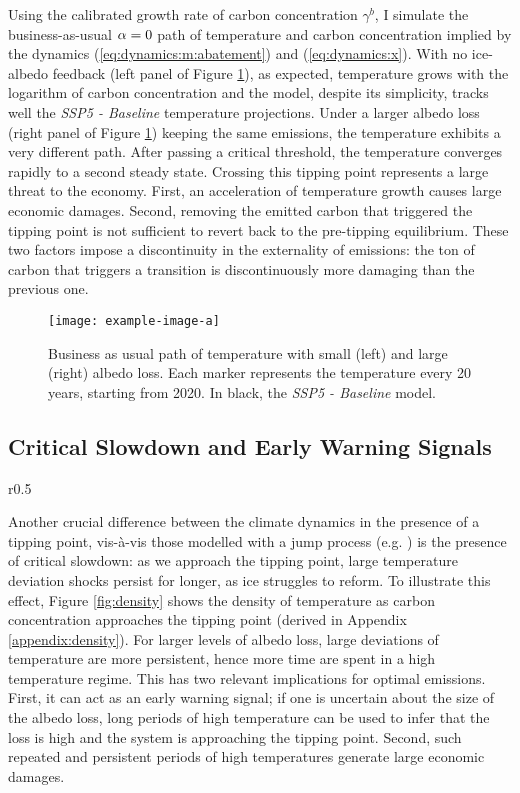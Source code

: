 \documentclass[../../main.tex]{subfiles}
\begin{document}
Using the calibrated growth rate of carbon concentration $\gamma^{b}$, I simulate the business-as-usual $\alpha = 0$ path of temperature and carbon concentration implied by the dynamics (\ref{eq:dynamics:m:abatement}) and (\ref{eq:dynamics:x}). With no ice-albedo feedback (left panel of Figure \ref{fig:bau}), as expected, temperature grows with the logarithm of carbon concentration and the model, despite its simplicity, tracks well the \textit{SSP5 - Baseline} temperature projections. Under a larger albedo loss (right panel of Figure \ref{fig:bau}) keeping the same emissions, the temperature exhibits a very different path. After passing a critical threshold, the temperature converges rapidly to a second steady state. Crossing this tipping point represents a large threat to the economy. First, an acceleration of temperature growth causes large economic damages. Second, removing the emitted carbon that triggered the tipping point is not sufficient to revert back to the pre-tipping equilibrium. These two factors impose a discontinuity in the externality of emissions: the ton of carbon that triggers a transition is discontinuously more damaging than the previous one.

\begin{figure}[H]
    \centering
    \texttt{[image: example-image-a]}
    \caption{Business as usual path of temperature with small (left) and large (right) albedo loss. Each marker represents the temperature every 20 years, starting from 2020. In black, the \textit{SSP5 - Baseline} model.}
    \label{fig:bau}
\end{figure}

\subsection{Critical Slowdown and Early Warning Signals}

\begin{wrapfigure}{r}{0.5\textwidth}
    \centering
    
    \caption{Density of temperature shocks at $M = 600$.}
    \label{fig:density}
\end{wrapfigure}
Another crucial difference between the climate dynamics in the presence of a tipping point, vis-à-vis those modelled with a jump process (e.g. \citealt{dietz_economic_2021,hambel_optimal_2021}) is the presence of critical slowdown: as we approach the tipping point, large temperature deviation shocks persist for longer, as ice struggles to reform. To illustrate this effect, Figure \ref{fig:density} shows the density of temperature as carbon concentration approaches the tipping point (derived in Appendix \ref{appendix:density}). For larger levels of albedo loss, large deviations of temperature are more persistent, hence more time are spent in a high temperature regime. This has two relevant implications for optimal emissions. First, it can act as an early warning signal; if one is uncertain about the size of the albedo loss, long periods of high temperature can be used to infer that the loss is high and the system is approaching the tipping point. Second, such repeated and persistent periods of high temperatures generate large economic damages.
\end{document}

